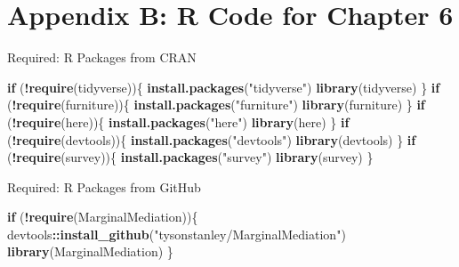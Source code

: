 \documentclass[]{DissertateUSU}
\newenvironment{Shaded}{\begin{snugshade}}{\end{snugshade}}
\newcommand{\KeywordTok}[1]{\textcolor[rgb]{0.13,0.29,0.53}{\textbf{#1}}}
\newcommand{\StringTok}[1]{\textcolor[rgb]{0.31,0.60,0.02}{#1}}
\newcommand{\ControlFlowTok}[1]{\textcolor[rgb]{0.13,0.29,0.53}{\textbf{#1}}}
\newcommand{\OperatorTok}[1]{\textcolor[rgb]{0.81,0.36,0.00}{\textbf{#1}}}
\newcommand{\NormalTok}[1]{#1}
\begin{document}
\normalsize

\clearpage

\doublespacing

\section*{Appendix B: R Code for Chapter
6}\label{appendix-b-r-code-for-chapter-6}

\singlespace

Required: R Packages from CRAN

\small

\begin{Shaded}
\begin{Highlighting}[]
\ControlFlowTok{if}\NormalTok{ (}\OperatorTok{!}\KeywordTok{require}\NormalTok{(tidyverse))\{}
  \KeywordTok{install.packages}\NormalTok{(}\StringTok{"tidyverse"}\NormalTok{)}
  \KeywordTok{library}\NormalTok{(tidyverse)}
\NormalTok{\}}
\ControlFlowTok{if}\NormalTok{ (}\OperatorTok{!}\KeywordTok{require}\NormalTok{(furniture))\{}
  \KeywordTok{install.packages}\NormalTok{(}\StringTok{"furniture"}\NormalTok{)}
  \KeywordTok{library}\NormalTok{(furniture)}
\NormalTok{\}}
\ControlFlowTok{if}\NormalTok{ (}\OperatorTok{!}\KeywordTok{require}\NormalTok{(here))\{}
  \KeywordTok{install.packages}\NormalTok{(}\StringTok{"here"}\NormalTok{)}
  \KeywordTok{library}\NormalTok{(here)}
\NormalTok{\}}
\ControlFlowTok{if}\NormalTok{ (}\OperatorTok{!}\KeywordTok{require}\NormalTok{(devtools))\{}
  \KeywordTok{install.packages}\NormalTok{(}\StringTok{"devtools"}\NormalTok{)}
  \KeywordTok{library}\NormalTok{(devtools)}
\NormalTok{\}}
\ControlFlowTok{if}\NormalTok{ (}\OperatorTok{!}\KeywordTok{require}\NormalTok{(survey))\{}
  \KeywordTok{install.packages}\NormalTok{(}\StringTok{"survey"}\NormalTok{)}
  \KeywordTok{library}\NormalTok{(survey)}
\NormalTok{\}}
\end{Highlighting}
\end{Shaded}

\normalsize

Required: R Packages from GitHub

\small

\begin{Shaded}
\begin{Highlighting}[]
\ControlFlowTok{if}\NormalTok{ (}\OperatorTok{!}\KeywordTok{require}\NormalTok{(MarginalMediation))\{}
\NormalTok{  devtools}\OperatorTok{::}\KeywordTok{install_github}\NormalTok{(}\StringTok{"tysonstanley/MarginalMediation"}\NormalTok{)}
  \KeywordTok{library}\NormalTok{(MarginalMediation)}
\NormalTok{\}}
\end{Highlighting}
\end{Shaded}
\end{document}
